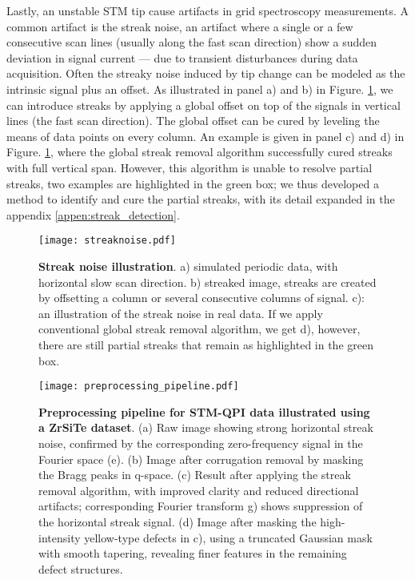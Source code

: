 Lastly, an unstable \ac{STM} tip cause artifacts in grid spectroscopy measurements. A common  artifact is the streak noise, an artifact where a single or a few consecutive scan lines (usually along the fast scan direction) show a sudden deviation in signal current — due to transient disturbances during data acquisition. Often the streaky noise induced by tip change can be modeled as the intrinsic signal plus an offset. As illustrated in panel a) and b) in Figure. \ref{fig:streaks}, we can introduce streaks by applying a global offset on top of the signals in vertical lines (the fast scan direction). The global offset can be cured by leveling the means of data points on every column. An example is given in panel c) and d) in Figure. \ref{fig:streaks}, where the global streak removal algorithm successfully cured streaks with full vertical span. However, this algorithm is unable to resolve partial streaks, two examples are highlighted in the green box; we thus developed a method to identify and cure the partial streaks, with its detail expanded in the appendix \ref{appen:streak_detection}.

\begin{figure}
	\texttt{[image: streaknoise.pdf]} 
	\centering
	\caption[\textbf{Streak noise illustration}]{\textbf{Streak noise illustration}. a) simulated periodic data, with horizontal slow scan direction. b) streaked image, streaks are created by offsetting a column or several consecutive columns of signal. c): an illustration of the streak noise in real data. If we apply conventional global streak removal algorithm, we get d), however, there are still partial streaks that remain as highlighted in the green box.}
	\label{fig:streaks}
\end{figure}

\begin{figure}
	\texttt{[image: preprocessing\_pipeline.pdf]} 
	\centering
	\caption[\textbf{Preprocessing pipeline for STM-QPI data illustrated using a ZrSiTe dataset}]{\textbf{Preprocessing pipeline for STM-QPI data illustrated using a ZrSiTe dataset}. (a) Raw image showing strong horizontal streak noise, confirmed by the corresponding zero-frequency signal in the Fourier space (e). (b) Image after corrugation removal by masking the Bragg peaks in q-space. (c) Result after applying the streak removal algorithm, with improved clarity and reduced directional artifacts; corresponding Fourier transform g) shows suppression of the horizontal streak signal. (d) Image after masking the high-intensity yellow-type defects in c), using a truncated Gaussian mask with smooth tapering, revealing finer features in the remaining defect structures.}
	\label{fig:pipeline}
\end{figure}

